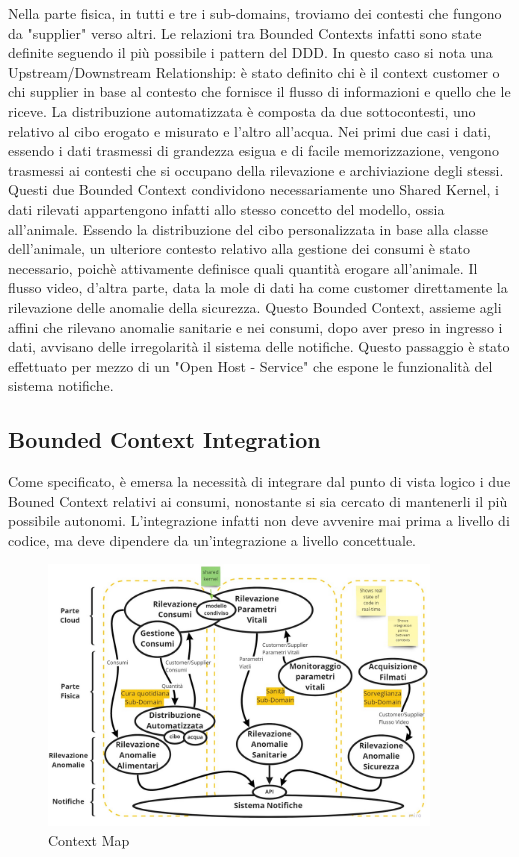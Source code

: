     Nella parte fisica, in tutti e tre i sub-domains, troviamo dei contesti che fungono da "supplier" verso altri. Le relazioni tra Bounded Contexts infatti sono state definite seguendo il più possibile i pattern del DDD. In questo caso si nota una Upstream/Downstream Relationship: è stato definito chi è il context customer o chi supplier in base al contesto che fornisce il flusso di informazioni e quello che le riceve. 
    La distribuzione automatizzata è composta da due sottocontesti, uno relativo al cibo erogato e misurato e l'altro all'acqua.
    Nei primi due casi i dati, essendo i dati trasmessi di grandezza esigua e di facile memorizzazione, vengono trasmessi ai contesti che si occupano della rilevazione e archiviazione degli stessi. Questi due Bounded Context condividono necessariamente uno Shared Kernel, i dati rilevati appartengono infatti allo stesso concetto del modello, ossia all'animale. 
    Essendo la distribuzione del cibo personalizzata in base alla classe dell'animale, un ulteriore contesto relativo alla gestione dei consumi è stato necessario, poichè attivamente definisce quali quantità erogare all'animale.
    Il flusso video, d'altra parte, data la mole di dati ha come customer direttamente la rilevazione delle anomalie della sicurezza. Questo Bounded Context, assieme agli affini che rilevano anomalie sanitarie e nei consumi, dopo aver preso in ingresso i dati, avvisano delle irregolarità il sistema delle notifiche. Questo passaggio è stato effettuato per mezzo di un "Open Host - Service" che espone le funzionalità del sistema notifiche.

    \subsection{Bounded Context Integration}
    Come specificato, è emersa la necessità di integrare dal punto di vista logico i due Bouned Context relativi ai consumi, nonostante si sia cercato di mantenerli il più possibile autonomi. L'integrazione infatti non deve avvenire mai prima a livello di codice, ma deve dipendere da un'integrazione a livello concettuale. 

    \begin{figure}[H]
        \caption{Context Map}
        \label{fig:ContextMap}
        \centering
        \includegraphics[width=0.9\textwidth]{Miro/ContextMap.jpg}
    \end{figure}
    